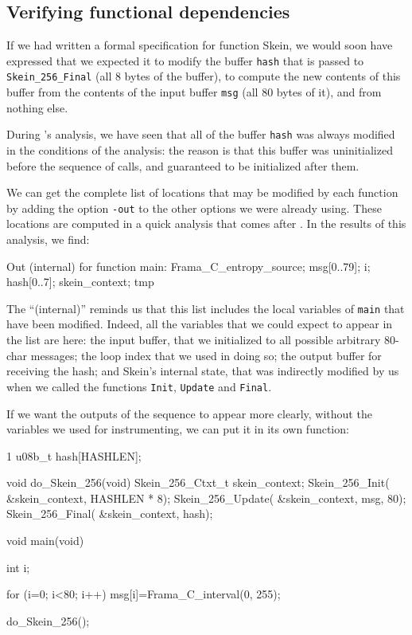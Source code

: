 \documentclass{frama-c-book}
\begin{document}
\subsection{Verifying functional dependencies}

If we had written a formal specification for function Skein, we would soon
have expressed that we expected it to modify the buffer \lstinline|hash|
that is passed to \lstinline|Skein_256_Final| (all 8 bytes of the buffer),
to compute the new contents of this buffer from the contents of the
input buffer \lstinline|msg| (all 80 bytes of it), and from nothing else.

During \Eva{}'s analysis, we have seen that all of the buffer \verb|hash|
was always modified in the conditions of the analysis: the reason is that
this buffer was uninitialized before the sequence of calls,
and guaranteed to be initialized after them.

We can get the complete list of locations that may be modified by each
function by adding the option \verb|-out| to the other options we were
already using. These locations are computed in a quick analysis that comes
after \Eva{}. In the results of this analysis, we find:
\begin{logsmath}
[inout] Out (internal) for function main:
          Frama_C_entropy_source; msg[0..79]; i; hash[0..7]; skein_context; tmp
\end{logsmath}
The ``(internal)'' reminds us that this list includes the local variables
of \lstinline|main| that have been modified. Indeed, all the variables
that we could expect to appear in the list are here: the input buffer, that
we initialized to all possible arbitrary 80-char messages; the loop index
that we used in doing so; the output buffer for receiving the hash;
and Skein's internal state, that was indirectly modified by us when we called
the functions \lstinline|Init|, \lstinline|Update| and \lstinline|Final|.

If we want the outputs of the sequence to appear more clearly, without the
variables we used for instrumenting, we can put it in its own function:

\begin{listing}{1}
u08b_t hash[HASHLEN];

void do_Skein_256(void)
{
  Skein_256_Ctxt_t skein_context;
  Skein_256_Init( &skein_context, HASHLEN * 8);
  Skein_256_Update( &skein_context, msg, 80);
  Skein_256_Final( &skein_context, hash);
}

void main(void)
{
  int i;

  for (i=0; i<80; i++) msg[i]=Frama_C_interval(0, 255);

  do_Skein_256();
}
\end{listing}
\end{document}

